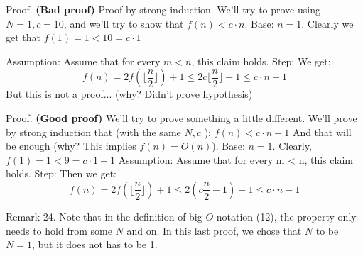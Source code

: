 Proof. \textbf{(Bad proof)}
Proof by strong induction. We’ll try to prove using \(N = 1, c = 10\), and we’ll try to show that \(f(n) < c \cdot n\).
Base: \(n = 1\). Clearly we get that \(f(1) = 1 < 10 = c \cdot 1\)

Assumption: Assume that for every \(m < n\), this claim holds.
Step: We get:
\begin{equation*}
    f(n) = 2f\left( \lfloor  \frac{n}{2} \rfloor \right) + 1 \le 2c\lfloor  \frac{n}{2} \rfloor  + 1 \le c\cdot n + 1
\end{equation*}
But this is not a proof... (why? Didn’t prove hypothesis)


Proof. \textbf{(Good proof)} We’ll try to prove something a little different. We’ll prove by strong induction that (with the same \(N, c\) ): \(f(n) < c \cdot n - 1\) And that will be enough (why? This implies \(f(n) = O(n)\)).
Base: \(n = 1\). Clearly, \(f(1) = 1 < 9 = c \cdot 1 - 1\)
Assumption: Assume that for every m < n, this claim holds.
Step: Then we get:
\begin{equation*}
    f(n) = 2f\left( \lfloor  \frac{n}{2} \rfloor \right) + 1 \le 2\left(c  \frac{n}{2} -1 \right)  + 1 \le c\cdot n - 1
\end{equation*}

Remark 24. Note that in the definition of big \(O\) notation (12), the property only needs to hold from some \(N\) and on. In this
last proof, we chose that \(N\) to be \(N = 1\), but it does not has to be 1.



